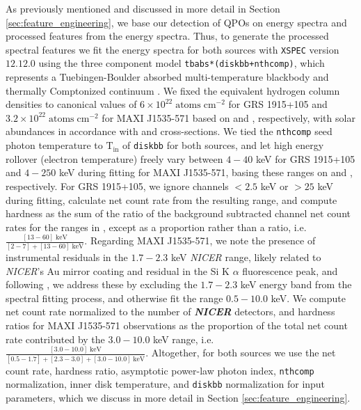 \documentclass[fleqn,usenatbib,twocolumn]{mnras}%
\begin{document}
As previously mentioned and discussed in more detail in Section \ref{sec:feature_engineering}, we base our detection of QPOs on energy spectra and processed features from the energy spectra. Thus, to generate the processed spectral features we fit the energy spectra for both sources with \texttt{XSPEC} version $12.12.0$ \citep{XSPEC1999} using the three component model \texttt{tbabs*(diskbb+nthcomp)}, which represents a Tuebingen-Boulder absorbed multi-temperature blackbody and thermally Comptonized continuum \citep{Mitsuda1984,Zdziarski1996,Kubota1998,Zycki1999}. We fixed the equivalent hydrogen column densities to canonical values of $6\times10^{22}\;\mathrm{atoms}\;\mathrm{cm}^{-2}$ for GRS 1915+105 and $3.2\times10^{22}\;\mathrm{atoms}\;\mathrm{cm}^{-2}$ for MAXI J1535-571 based on \cite{astrosatviewofGRS} and \cite{cuneo2020}, respectively, with solar abundances in accordance with \cite{Wilms2000} and \cite{VernerCrossSections} cross-sections. We tied the \texttt{nthcomp} seed photon temperature to $\mathrm{T}_{\mathrm{in}}$ of \texttt{diskbb} for both sources, and let high energy rollover (electron temperature) freely vary between $4-40$ keV for GRS 1915+105 and $4-250$ keV during fitting for MAXI J1535-571, basing these ranges on \cite{zhangGRS2022} and \cite{Dong2022MAXIkTe}, respectively. For GRS 1915+105, we ignore channels $<2.5$ keV or $>25$ keV during fitting, calculate net count rate from the resulting range, and compute hardness as the sum of the ratio of the background subtracted channel net count rates for the ranges in \cite{zhangGRS2022}, except as a proportion rather than a ratio, i.e. $\frac{[13-60]\;\mathrm{keV}}{[2-7]+[13-60]\;\mathrm{keV}}$. Regarding MAXI J1535-571, we note the presence of instrumental residuals in the $1.7-2.3$ keV \textit{NICER} range, likely related to \textit{NICER}'s Au mirror coating and residual in the Si K $\alpha$ fluorescence peak, and following \cite{miller2018}, we address these by excluding the $1.7-2.3$ keV energy band from the spectral fitting process, and otherwise fit the range $0.5-10.0$ keV. We compute net count rate normalized to the number of \textbf{\textit{NICER}} detectors, and hardness ratios for MAXI J1535-571 observations as the proportion of the total net count rate contributed by the $3.0-10.0$ keV range, i.e. $\frac{[3.0-10.0]\;\mathrm{keV}}{[0.5-1.7]+[2.3-3.0]+[3.0-10.0]\;\mathrm{keV}}$. Altogether, for both sources we use the net count rate, hardness ratio, asymptotic power-law photon index, \texttt{nthcomp} normalization, inner disk temperature, and \texttt{diskbb} normalization for input parameters, which we discuss in more detail in Section \ref{sec:feature_engineering}. 
\end{document}
